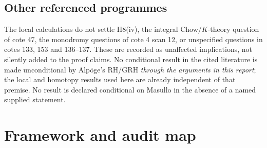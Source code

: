 \documentclass[11pt,a4paper]{article}
\theoremstyle{definition}\newtheorem{remark}[theorem]{Remark}
\begin{document}
\subsection{Other referenced programmes}

The local calculations do not settle H8(iv), the integral Chow/$K$-theory question of cote 47, the monodromy questions of cote 4 scan 12, or unspecified questions in cotes 133, 153 and 136--137. These are recorded as unaffected implications, not silently added to the proof claims. No conditional result in the cited literature is made unconditional by Alp\"oge's RH/GRH \emph{through the arguments in this report}; the local and homotopy results used here are already independent of that premise. No result is declared conditional on Masullo in the absence of a named supplied statement.

\section{Framework and audit map}
\end{document}

